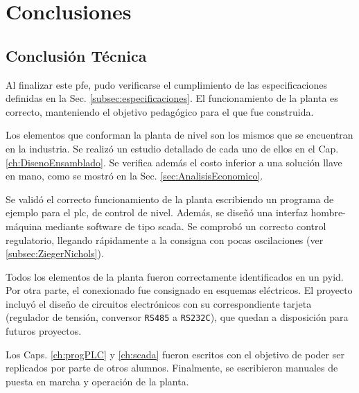 \chapter{Conclusiones}
\label{ch:conclusiones}

\section{Conclusión Técnica}
\label{sec:ConclusionTecnica}

Al finalizar este \gls{pfe}, pudo verificarse el cumplimiento de las
especificaciones definidas en la Sec. \ref{subsec:especificaciones}.
El funcionamiento de la planta es correcto, manteniendo el objetivo pedagógico
para el que fue construida.

Los elementos que conforman la planta de nivel son los mismos que se
encuentran en la industria.
Se realizó un estudio detallado de cada uno de ellos en el Cap.
\ref{ch:DisenoEnsamblado}.
Se verifica además el costo inferior a una solución llave en mano, como se
mostró en la Sec. \ref{sec:AnalisisEconomico}.

Se validó el correcto funcionamiento de la planta escribiendo un programa de
ejemplo para el \gls{plc}, de control de nivel.
Además, se diseñó una interfaz hombre-máquina mediante software de tipo
\gls{scada}.
Se comprobó un correcto control regulatorio, llegando rápidamente a la consigna
con pocas oscilaciones (ver \ref{subsec:ZiegerNichols}).

Todos los elementos de la planta fueron correctamente identificados en un
\gls{pyid}.
Por otra parte, el conexionado fue consignado en esquemas eléctricos.
El proyecto incluyó el diseño de circuitos electrónicos con su correspondiente
tarjeta (regulador de tensión, conversor \verb|RS485| a \verb|RS232C|), que
quedan a disposición para futuros proyectos.

Los Caps. \ref{ch:progPLC} y \ref{ch:scada} fueron escritos con el
objetivo de poder ser replicados por parte de otros alumnos.
Finalmente, se escribieron manuales de puesta en marcha y operación de la
planta.

